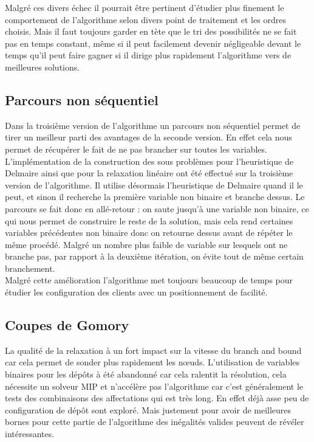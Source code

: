 \documentclass[12pt,a4paper]{article}
\begin{document}
Malgré ces divers échec il pourrait être pertinent d’étudier plus finement le comportement de l'algorithme selon divers point de traitement et les ordres choisis. Mais il faut toujours garder en tète que le tri des possibilités ne se fait pas en temps constant, même si il peut facilement devenir négligeable devant le temps qu'il peut faire gagner si il dirige plus rapidement l'algorithme vers de meilleures solutions.

\subsection{Parcours non séquentiel}

Dans la troisième version de l'algorithme un parcours non séquentiel permet de tirer un meilleur parti des avantages de la seconde version. En effet cela nous permet de récupérer le fait de ne pas brancher sur toutes les variables.\\

L'implémentation de la construction des sous problèmes pour l'heuristique de Delmaire ainsi que pour la relaxation linéaire ont été effectué sur la troisième version de l'algorithme. Il utilise désormais l'heuristique de Delmaire quand il le peut, et sinon il recherche la première variable non binaire et branche dessus. Le parcours se fait donc en allé-retour : on saute jusqu’à une variable non binaire, ce qui nous permet de construire le reste de la solution, mais cela rend certaines variables précédentes non binaire donc on retourne dessus avant de répéter le même procédé. Malgré un nombre plus faible de variable sur lesquels ont ne branche pas, par rapport à la deuxième itération, on évite tout de même certain branchement.\\

Malgré cette amélioration l'algorithme met toujours beaucoup de temps pour étudier les configuration des clients avec un positionnement de facilité.\\

\subsection{Coupes de Gomory}

La qualité de la relaxation à un fort impact sur la vitesse du branch and bound car cela permet de sonder plus rapidement les nœuds. L'utilisation de variables binaires pour les dépôts à été abandonné car cela ralentit la résolution, cela nécessite un solveur MIP et n'accélère pas l'algorithme car c'est généralement le tests des combinaisons des affectations qui est très long. En effet déjà asse peu de configuration de dépôt sont exploré. Mais justement pour avoir de meilleures bornes pour cette partie de l'algorithme des inégalités valides peuvent de révéler intéressantes.\\
\end{document}

